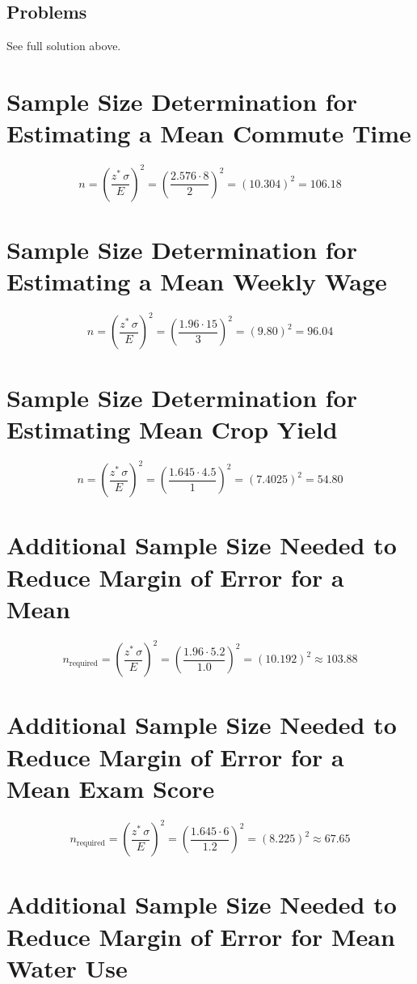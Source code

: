 \subsection*{Problems}
See full solution above.

\section{Sample Size Determination for Estimating a Mean Commute Time}
\[n = \left(\frac{z^*\,\sigma}{E}\right)^2
		= \left(\frac{2.576 \cdot 8}{2}\right)^2
		= \left(10.304\right)^2
		= 106.18\]

\section{Sample Size Determination for Estimating a Mean Weekly Wage}
\[n = \left(\frac{z^*\,\sigma}{E}\right)^2
		= \left(\frac{1.96 \cdot 15}{3}\right)^2
		= \left(9.80\right)^2
		= 96.04\]

\section{Sample Size Determination for Estimating Mean Crop Yield}
\[n = \left(\frac{z^*\,\sigma}{E}\right)^2
		= \left(\frac{1.645 \cdot 4.5}{1}\right)^2
		= \left(7.4025\right)^2
		= 54.80\]

\section{Additional Sample Size Needed to Reduce Margin of Error for a Mean}
\[n_{\text{required}} = \left(\frac{z^*\,\sigma}{E}\right)^2
		= \left(\frac{1.96 \cdot 5.2}{1.0}\right)^2
		= \left(10.192\right)^2
		\approx 103.88\]

\section{Additional Sample Size Needed to Reduce Margin of Error for a Mean Exam Score}
\[n_{\text{required}} = \left(\frac{z^*\,\sigma}{E}\right)^2
		= \left(\frac{1.645 \cdot 6}{1.2}\right)^2
		= \left(8.225\right)^2
		\approx 67.65\]

\section{Additional Sample Size Needed to Reduce Margin of Error for Mean Water Use}



